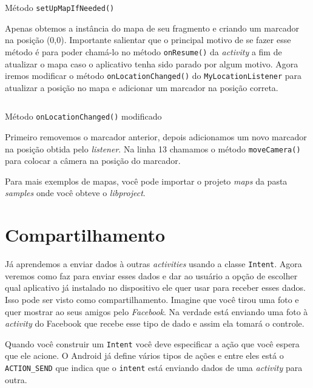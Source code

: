 \documentclass[a4paper,12pt,brazil,oneside]{book}
\begin{document}
\begin{singlespace}
		\begin{listing}[H]
		\inputminted[linenos=true,fontsize=\small,frame=lines, framesep=2mm, tabsize=2,numbersep=5pt]{java}{src/api/maps/setupif.java}
		\caption{Método \texttt{setUpMapIfNeeded()}}
		\label{code:setupif}
		\end{listing} 	

		Apenas obtemos a instância do mapa de seu fragmento e criando um marcador na posição (0,0). Importante salientar que o principal motivo de se fazer esse método é para poder chamá-lo no método \texttt{onResume()} da \emph{activity} a fim de atualizar o mapa caso o aplicativo tenha sido parado por algum motivo. Agora iremos modificar o método \texttt{onLocationChanged()} do \texttt{MyLocationListener} para atualizar a posição no mapa e adicionar um marcador na posição correta.
		
		\begin{listing}[H]
		\inputminted[linenos=true,fontsize=\small,frame=lines, framesep=2mm, tabsize=2,numbersep=5pt]{java}{src/api/maps/onlocmod.java}
		\caption{Método \texttt{onLocationChanged()} modificado}
		\label{code:onlocmod}
		\end{listing} 	
		
		Primeiro removemos o marcador anterior, depois adicionamos um novo marcador na posição obtida pelo \emph{listener}. Na linha 13 chamamos o método \texttt{moveCamera()} para colocar a câmera na posição do marcador. 

		Para mais exemplos de mapas, você pode importar o projeto \emph{maps} da pasta \emph{samples} onde você obteve o \emph{libproject}.
	
\chapter{Compartilhamento} 

		Já aprendemos a enviar dados à outras \emph{activities} usando a classe \texttt{Intent}. Agora veremos como faz para enviar esses dados e dar ao usuário a opção de escolher qual aplicativo já instalado no dispositivo ele quer usar para receber esses dados. Isso pode ser visto como compartilhamento. Imagine que você tirou uma foto e quer mostrar ao seus amigos pelo \emph{Facebook}. Na verdade está enviando uma foto à \emph{activity} do Facebook que recebe esse tipo de dado e assim ela tomará o controle.

		Quando você construir um \texttt{Intent} você deve especificar a ação que você espera que ele acione. O Android já define vários tipos de ações e entre eles está o \texttt{ACTION\_SEND} que indica que o \texttt{intent} está enviando dados de uma \emph{activity} para outra. 


\end{singlespace}
\end{document}
